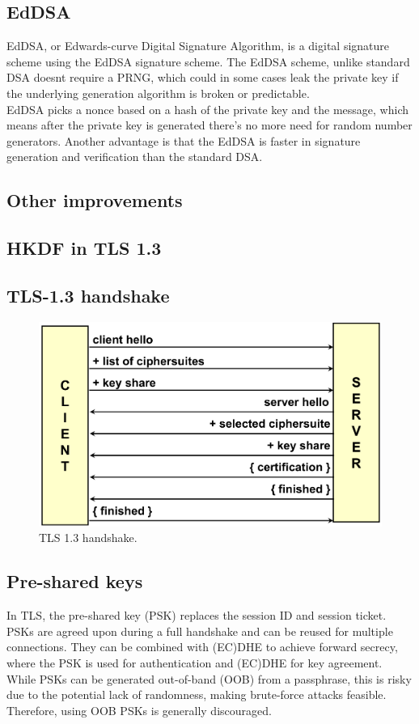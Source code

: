 \documentclass{report}
\begin{document}
\subsection{EdDSA}
EdDSA, or Edwards-curve Digital Signature Algorithm, is a digital 
signature scheme using the EdDSA signature scheme. The EdDSA scheme,
unlike standard DSA doesnt require a PRNG, which could in some cases
leak the private key if the underlying generation algorithm is broken
or predictable.\\
EdDSA picks a nonce based on a hash of the private key and the
message, which means after the private key is generated there’s no
more need for random number generators. Another advantage is that the
EdDSA is faster in signature generation and verification than the
standard DSA.


\subsection{Other improvements}

\subsection{HKDF in TLS 1.3}

\subsection{TLS-1.3 handshake}

\begin{figure}[H]
  \centering
  \includegraphics[width=.6\textwidth]{img/TLS 1-3 handshake.png}
  \caption{TLS 1.3 handshake.}
  \label{fig:tls-1.3-handshake}
\end{figure}

\subsection{Pre-shared keys}
In TLS, the pre-shared key (PSK) replaces the session ID and session
ticket. PSKs are agreed upon during a full handshake and can be reused
for multiple connections. They can be combined with (EC)DHE to achieve
forward secrecy, where the PSK is used for authentication and (EC)DHE
for key agreement. While PSKs can be generated out-of-band (OOB) from
a passphrase, this is risky due to the potential lack of randomness,
making brute-force attacks feasible. Therefore, using OOB PSKs is
generally discouraged.
\end{document}
